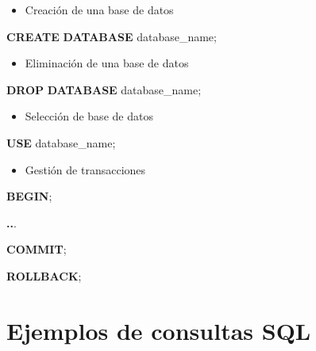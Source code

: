 \documentclass[
]{book}
\newenvironment{Shaded}{\begin{snugshade}}{\end{snugshade}}
\newcommand{\ControlFlowTok}[1]{\textcolor[rgb]{0.13,0.29,0.53}{\textbf{#1}}}
\newcommand{\KeywordTok}[1]{\textcolor[rgb]{0.13,0.29,0.53}{\textbf{#1}}}
\newcommand{\NormalTok}[1]{#1}
\newcommand{\OperatorTok}[1]{\textcolor[rgb]{0.81,0.36,0.00}{\textbf{#1}}}
\providecommand{\tightlist}{%
  \setlength{\itemsep}{0pt}\setlength{\parskip}{0pt}}
\begin{document}
\begin{itemize}
\tightlist
\item
  Creación de una base de datos
\end{itemize}

\begin{Shaded}
\begin{Highlighting}[]
\KeywordTok{CREATE} \KeywordTok{DATABASE}\NormalTok{ database\_name;}
\end{Highlighting}
\end{Shaded}

\begin{itemize}
\tightlist
\item
  Eliminación de una base de datos
\end{itemize}

\begin{Shaded}
\begin{Highlighting}[]
\KeywordTok{DROP} \KeywordTok{DATABASE}\NormalTok{ database\_name;}
\end{Highlighting}
\end{Shaded}

\begin{itemize}
\tightlist
\item
  Selección de base de datos
\end{itemize}

\begin{Shaded}
\begin{Highlighting}[]
\KeywordTok{USE}\NormalTok{ database\_name;}
\end{Highlighting}
\end{Shaded}

\begin{itemize}
\tightlist
\item
  Gestión de transacciones
\end{itemize}

\begin{Shaded}
\begin{Highlighting}[]
\ControlFlowTok{BEGIN}\NormalTok{;}

  \OperatorTok{..}\NormalTok{.}
  
\KeywordTok{COMMIT}\NormalTok{;}

\KeywordTok{ROLLBACK}\NormalTok{;}
\end{Highlighting}
\end{Shaded}

\section{Ejemplos de consultas SQL}\label{ejemplos-de-consultas-sql}
\end{document}

